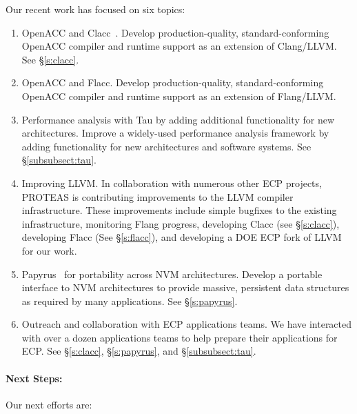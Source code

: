 Our recent work has focused on six topics:

\begin{enumerate}
    
    \item OpenACC and Clacc~\cite{clacc:2018:denny}. Develop production-quality, standard-conforming OpenACC compiler and runtime support as an extension of Clang/LLVM. See \S\ref{s:clacc}.
    
    \item OpenACC and Flacc. Develop production-quality, standard-conforming OpenACC compiler and runtime support as an extension of Flang/LLVM. 

    \item Performance analysis with Tau by adding additional functionality for new architectures. 
    Improve a widely-used performance analysis framework by adding functionality for new architectures and software systems.
    See \S\ref{subsubsect:tau}.

    \item Improving LLVM. In collaboration with numerous other ECP projects, PROTEAS is contributing improvements to the LLVM compiler infrastructure. These improvements include simple bugfixes to the existing infrastructure, monitoring Flang progress, developing Clacc (see \S\ref{s:clacc}), developing Flacc (See \S\ref{s:flacc}), and developing a DOE ECP fork of LLVM for our work.
    
    \item Papyrus~\cite{Kim:2017:DIP,Kim:2017:PHP} for portability across NVM architectures. 
Develop a portable interface to NVM architectures to provide massive, persistent data structures as required by many applications.
See \S\ref{s:papyrus}.

    \item Outreach and collaboration with ECP applications teams. 
    We have interacted with over a dozen applications teams to help prepare their applications for ECP. See \S\ref{s:clacc}, \S\ref{s:papyrus}, and \S\ref{subsubsect:tau}.
    
\end{enumerate}

\paragraph{Next Steps:}

Our next efforts are:

